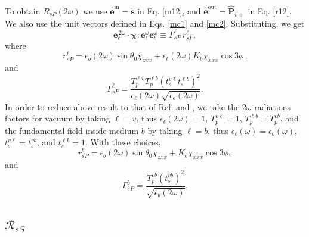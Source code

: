 \documentclass[aps,11pt]{revtex4}
\begin{document}
To obtain $R_{sP}(2\omega)$ we use
$\hat{\mathbf{e}}^{\mathrm{in}}=\hat{\mathbf{s}}$ in Eq. \eqref{m12}, and
$\hat{\mathbf{e}}^{\mathrm{out}}=\hat{\mathbf{P}}_{v+}$ in Eq. \eqref{r12}. We
also use the unit vectors defined in Eqs. \eqref{mc1} and
\eqref{mc2}. Substituting, we get
\begin{equation}
\mathbf{e}^{\,2\omega}_{\ell}\cdot
\boldsymbol{\chi}:\mathbf{e}^\omega_{\ell}\mathbf{e}^\omega_{\ell}
\equiv\Gamma^{\ell}_{sP}\, r^{\ell}_{sP},
\end{equation}
where
\begin{equation}
r^{\ell}_{sP}
= \epsilon_{b}(2\omega)\sin\theta_0\chi_{zxx}
+ \epsilon_{\ell}(2\omega)K_{b}\chi_{xxx}\cos3\phi,
\end{equation} 
and  
\begin{equation}
\Gamma^{\ell}_{sP}=
\frac{T_{p}^{\ell v}T^{\ell b}_{p}\left(t_s^{v\ell}t^{\ell b}_s\right)^2}
     {\epsilon_{\ell}(2\omega)\sqrt{\epsilon_{b}(2\omega)}}.  
\end{equation} 
In order to reduce above result to that of Ref. \cite{mizrahiJOSA88} and
\cite{sipePRB87}, we take the $2\omega$ radiations factors for vacuum by
taking $\ell=v$, thus $\epsilon_{\ell}(2\omega)=1$, $T^{v\ell}_{p}=1$,
$T^{\ell b}_{p}=T^{vb}_{p}$, and the fundamental field inside medium $b$ by
taking $\ell=b$, thus $\epsilon_{\ell}(\omega)=\epsilon_{b}(\omega)$,
$t^{v\ell}_s=t^{vb}_s$, and $t^{\ell b}_s=1$. With these choices,
\begin{equation}
r^{b}_{sP} = \epsilon_{b}(2\omega)\sin\theta_0\chi_{zxx}
+ K_{b}\chi_{xxx}\cos3\phi,
\end{equation} 
and 
\begin{equation}
\Gamma^{b}_{sP} =
\frac{T^{v b}_{p}(t_s^{vb})^{2}}{\sqrt{\epsilon_{b}(2\omega)}}.  
\end{equation}


\subsection{\texorpdfstring{$\mathcal{R}_{sS}$}{RsS}}
\end{document}
